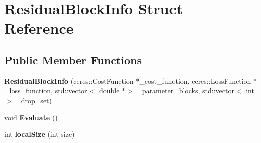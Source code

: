 \hypertarget{structResidualBlockInfo}{}\section{Residual\+Block\+Info Struct Reference}
\label{structResidualBlockInfo}
\subsection*{Public Member Functions}
\begin{DoxyCompactItemize}
\item 
\mbox{\label{structResidualBlockInfo_a18e8a25d3a530a2e7f12ea4fd9d26f0b}} 
{\bfseries Residual\+Block\+Info} (ceres\+::\+Cost\+Function $\ast$\+\_\+cost\+\_\+function, ceres\+::\+Loss\+Function $\ast$\+\_\+loss\+\_\+function, std\+::vector$<$ double $\ast$$>$ \+\_\+parameter\+\_\+blocks, std\+::vector$<$ int $>$ \+\_\+drop\+\_\+set)
\item 
\mbox{\label{structResidualBlockInfo_ae0baec87c89cefaaa5a64dec0ade08d0}} 
void {\bfseries Evaluate} ()
\item 
\mbox{\label{structResidualBlockInfo_a2dec1c6c1087c2355069f20e535e2bad}} 
int {\bfseries local\+Size} (int size)
\end{DoxyCompactItemize}
